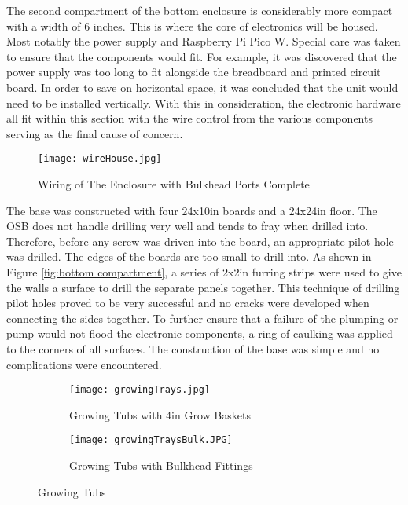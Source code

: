 \documentclass[12pt]{article} %
\begin{document}
The second compartment of the bottom enclosure is considerably more compact with a width of 6 inches. This is where the core of electronics will be housed. Most notably the power supply and Raspberry Pi Pico W. Special care was taken to ensure that the components would fit. For example, it was discovered that the power supply was too long to fit alongside the breadboard and printed circuit board. In order to save on horizontal space, it was concluded that the unit would need to be installed vertically. With this in consideration, the electronic hardware all fit within this section with the wire control from the various components serving as the final cause of concern.

\begin{figure}[H]
  \centering
  \texttt{[image: wireHouse.jpg]}
  \caption{Wiring of The Enclosure with Bulkhead Ports Complete}
  \label{fig:top housing}
\end{figure}

The base was constructed with four 24x10in boards and a 24x24in floor. The OSB does not handle drilling very well and tends to fray when drilled into. Therefore, before any screw was driven into the board, an appropriate pilot hole was drilled. The edges of the boards are too small to drill into. As shown in Figure \ref{fig:bottom compartment}, a series of 2x2in furring strips were used to give the walls a surface to drill the separate panels together. This technique of drilling pilot holes proved to be very successful and no cracks were developed when connecting the sides together. To further ensure that a failure of the plumping or pump would not flood the electronic components, a ring of caulking was applied to the corners of all surfaces. The construction of the base was simple and no complications were encountered. 


\begin{figure}[H]
    \centering
    \begin{subfigure}[b]{0.5\textwidth}
        \centering
        \texttt{[image: growingTrays.jpg]}
        \caption{Growing Tubs with 4in Grow Baskets}
        \label{fig:tubGrowbaskets}
    \end{subfigure}
    \begin{subfigure}[b]{0.45\textwidth}
        \centering
        \texttt{[image: growingTraysBulk.JPG]}
        \caption{Growing Tubs with Bulkhead Fittings}
        \label{fig:tubBulk}
    \end{subfigure}
    \caption{Growing Tubs}
    \label{fig:renderings}
\end{figure}
\end{document}
